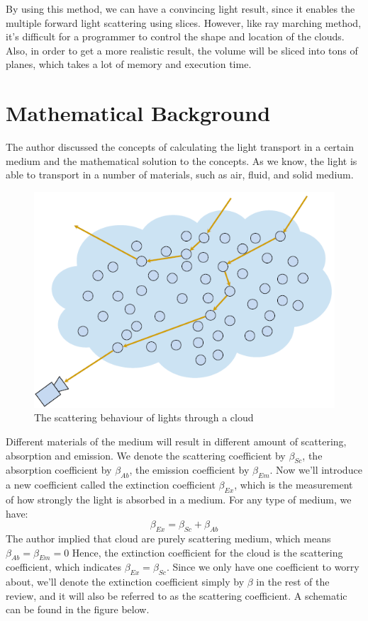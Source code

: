By using this method, we can have a convincing light result, since it enables the multiple forward light scattering using slices. However, like ray marching method, it's difficult for a programmer to control the shape and location of the clouds. Also, in order to get a more realistic result, the volume will be sliced into tons of planes, which takes a lot of memory and execution time.

\section{Mathematical Background}
The author discussed the concepts of calculating the light transport in a certain medium and the mathematical solution to the concepts. As we know, the light is able to transport in a number of materials, such as air, fluid, and solid medium. 
\begin{figure}[htp]
\begin{center}
\includegraphics[scale=0.4]{images/scattering.png}
\caption{The scattering behaviour of lights through a cloud}
\label{f5}
\end{center}
\end{figure}
Different materials of the medium will result in different amount of scattering, absorption and emission. We denote the scattering coefficient by $\beta_{Sc}$, the absorption coefficient by $\beta_{Ab}$, the emission coefficient by $\beta_{Em}$. Now we'll introduce a new coefficient called the extinction coefficient $\beta_{Ex}$, which is the measurement of how strongly the light is absorbed in a medium. For any type of medium, we have:
\begin{equation}
\beta_{Ex} = \beta_{Sc} + \beta_{Ab}
\end{equation}
The author implied that cloud are purely scattering medium, which means $\beta_{Ab} = \beta_{Em} = 0$
Hence, the extinction coefficient for the cloud is the scattering coefficient, which indicates $\beta_{Ex} = \beta_{Sc}$. Since we only have one coefficient to worry about, we'll denote the extinction coefficient simply by $\beta$ in the rest of the review, and it will also be referred to as the scattering coefficient. A schematic can be found in the figure below.

